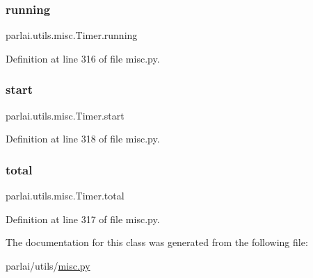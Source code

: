 \subsubsection{\texorpdfstring{running}{running}}
{\footnotesize\ttfamily parlai.\+utils.\+misc.\+Timer.\+running}



Definition at line 316 of file misc.\+py.

\mbox{\label{classparlai_1_1utils_1_1misc_1_1Timer_a1c32e2a8785377c980bc4b125fe6db0d}} 
\subsubsection{\texorpdfstring{start}{start}}
{\footnotesize\ttfamily parlai.\+utils.\+misc.\+Timer.\+start}



Definition at line 318 of file misc.\+py.

\mbox{\label{classparlai_1_1utils_1_1misc_1_1Timer_a37214900a663640b33bdce9e6b3053dd}} 
\subsubsection{\texorpdfstring{total}{total}}
{\footnotesize\ttfamily parlai.\+utils.\+misc.\+Timer.\+total}



Definition at line 317 of file misc.\+py.



The documentation for this class was generated from the following file\+:\begin{DoxyCompactItemize}
\item 
parlai/utils/\hyperlink{misc_8py}{misc.\+py}\end{DoxyCompactItemize}
